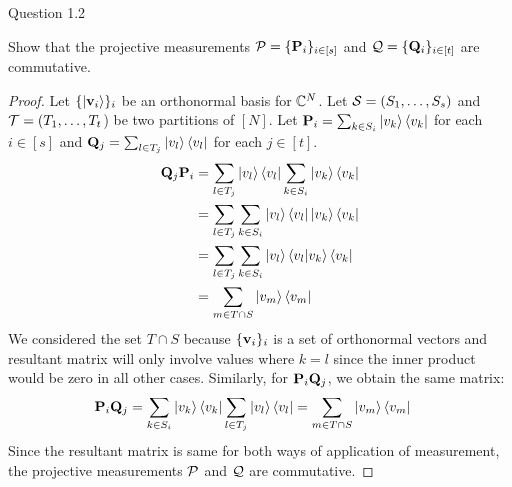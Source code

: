 \begin{solution}{Question 1.2}\label{ques:12}
    \begin{question}
    Show that the projective measurements $\mathcal{P} = \{\mathbf{P}_i \}_{i\in[s]}$ and $\mathcal{Q} = \{\mathbf{Q}_i \}_{i\in[t]}$ are commutative.
    \end{question}
    \tcblower{}
    \begin{proof}
    Let $\{\ket{\mathbf{v}_i}\}_i$ be an orthonormal basis for $\mathbb{C}^N$. Let $\mathcal{S} = (S_1, \ldots, S_s)$ and $\mathcal{T} = (T_1, \ldots, T_t$) be two partitions of $[N]$.
    Let $\mathbf{P}_i = \sum_{k\in S_i}\ket{v_k}\bra{v_k}$ for each $i \in [s]$ and $\mathbf{Q}_j = \sum_{l\in T_j}\ket{v_l}\bra{v_l}$ for each $j \in [t]$.\\

    \begin{equation}
    \begin{split}
        \mathbf{Q}_j \mathbf{P}_i &= \sum_{l\in T_j}\ket{v_l}\bra{v_l} \sum_{k\in S_i}\ket{v_k}\bra{v_k}\\
        &= \sum_{l\in T_j}\sum_{k\in S_i}\ket{v_l}\bra{v_l}\ket{v_k}\bra{v_k}\\
        &=\sum_{l\in T_j}\sum_{k\in S_i}\ket{v_l}\braket{v_l|v_k}\bra{v_k}\\
        &= \sum_{m\in T\cap S}\ket{v_m}\bra{v_m}
    \end{split}
    \end{equation}
    We considered the set $T\cap S$ because $\{\mathbf{v}_i\}_i$ is a set of orthonormal vectors and resultant matrix will only involve values where $k=l$ since the inner product would be zero in all other cases. Similarly, for $\mathbf{P}_i \mathbf{Q}_j $, we obtain the same matrix:\\
    \begin{equation}
    \begin{split}
        \mathbf{P}_i \mathbf{Q}_j &=  \sum_{k\in S_i}\ket{v_k}\bra{v_k}\sum_{l\in T_j}\ket{v_l}\bra{v_l}=\sum_{m\in T\cap S}\ket{v_m}\bra{v_m}
    \end{split}
    \end{equation}
    Since the resultant matrix is same for both ways of application of measurement, the projective measurements $\mathcal{P}$ and $\mathcal{Q}$ are commutative.
    \end{proof}
\end{solution}
